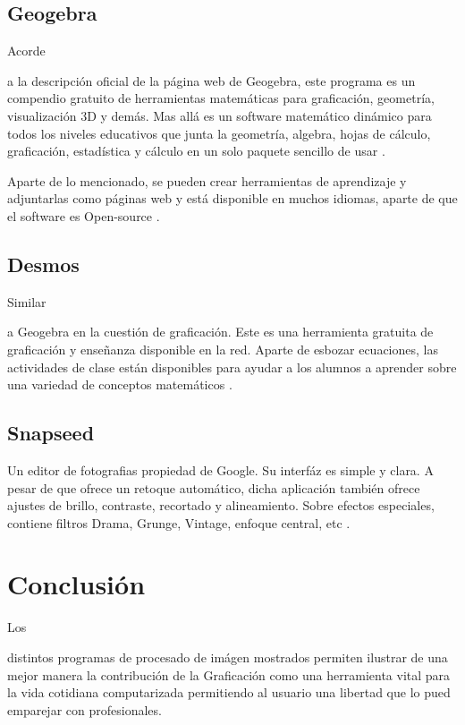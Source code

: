 \documentclass[stu, 12pt, letterpaper, donotrepeattitle, floatsintext, natbib]{apa7}
\begin{document}
    \subsection{Geogebra}
    Acorde \begin{justifying}
        a la descripción oficial de la página web de Geogebra, este programa es un compendio gratuito de herramientas matemáticas para graficación, geometría, visualización 3D y demás. Mas allá
    es un software matemático dinámico para todos los niveles educativos que junta la geometría, algebra, hojas de cálculo, graficación, estadística y cálculo en un solo paquete sencillo de usar \citep{geogebra-no-dateA}.\par
    Aparte de lo mencionado, se pueden crear herramientas de aprendizaje y adjuntarlas como páginas web y está disponible en muchos idiomas, aparte de que el software es Open-source \citep{geogebra-no-dateB}.\par 
    \end{justifying} 
    \subsection{Desmos}
    Similar \begin{justifying}
    a Geogebra en la cuestión de graficación. Este es una herramienta gratuita de graficación y enseñanza disponible en la red. Aparte de esbozar ecuaciones, las actividades de clase están disponibles
    para ayudar a los alumnos a aprender sobre una variedad de conceptos matemáticos \citep{unknown-author-2021}.\par 
    \end{justifying}
    \subsection{Snapseed}
    Un editor de fotografias propiedad de Google. Su interfáz es simple y clara. A pesar de que ofrece un retoque automático, dicha aplicación también ofrece ajustes de brillo, contraste, recortado y alineamiento.
    Sobre efectos especiales, contiene filtros Drama, Grunge, Vintage, enfoque central, etc \citep{pcmag-2013}.\par
    \section{Conclusión}
    Los \begin{justifying}
        distintos programas de procesado de imágen mostrados permiten ilustrar de una mejor manera la contribución de la Graficación como una herramienta vital para la vida cotidiana computarizada permitiendo
        al usuario una libertad que lo pued emparejar con profesionales.\par
    \end{justifying}
    
    \newpage   
    \renewcommand\refname{\textbf{Referencias}}
    
    
\end{document}
